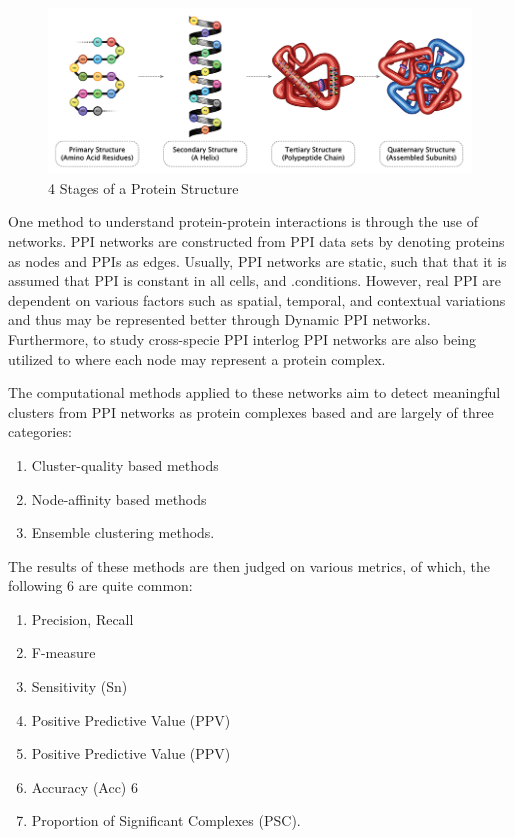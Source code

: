 \documentclass[11pt]{article}
\begin{document}
    \begin{figure}[h!]
        \centering
        \includegraphics[scale = 0.45]{Proposal/images/PROTEINS-2.jpg}
        \caption{4 Stages of a Protein Structure}
        \label{fig:proteindef}
    \end{figure}
    
    \newpage
    
    One method to understand protein-protein interactions is through the use of networks. PPI networks are constructed from PPI data sets by denoting proteins as nodes and PPIs as edges. Usually, PPI networks are static, such that that it is assumed that PPI is constant in all cells, and .conditions. However, real PPI are dependent on various factors such as spatial, temporal, and contextual variations and thus may be represented better through Dynamic PPI networks. Furthermore, to study cross-specie PPI interlog PPI networks are also being utilized to where each node may represent a protein complex. 
    
    The computational methods applied to these networks aim to detect meaningful clusters from PPI networks as protein complexes based and are largely of three categories:
    \begin{enumerate}
        \item Cluster-quality based methods
        \item Node-affinity based methods
        \item Ensemble clustering methods.
    \end{enumerate}
    The results of these methods are then judged on various metrics, of which, the following 6 are quite common:
    \begin{enumerate}
        \item Precision, Recall
        \item F-measure
        \item Sensitivity (Sn)
        \item Positive Predictive Value (PPV)
        \item Positive Predictive Value (PPV)
        \item Accuracy (Acc) 6
        \item Proportion of Significant Complexes (PSC).
    \end{enumerate}
\end{document}
